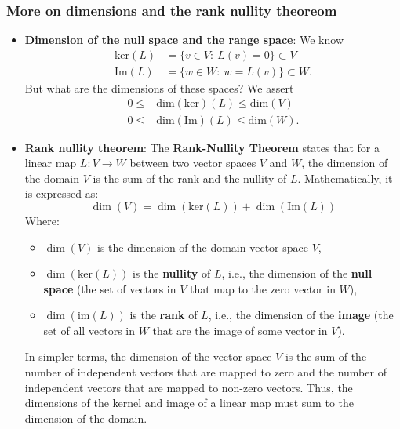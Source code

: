 \documentclass{report}
\begin{document}
    \subsubsection{More on dimensions and the rank nullity theoreom}
    \begin{itemize}
    \item \textbf{Dimension of the null space and the range space}: We know
        \begin{align*}
            \text{ker}(L) &= \{v\in V:\ L(v) = 0\} \subset V \\
            \text{Im}(L) &= \{w\in W:\ w = L(v)\} \subset W
        .\end{align*}
        But what are the dimensions of these spaces? We assert
        \begin{align*}
            0 \leq &\text{dim}(\text{ker})(L) \leq \text{dim}(V) \\
            0 \leq &\text{dim}(\text{Im})(L) \leq \text{dim}(W)
        .\end{align*}
        \item \textbf{Rank nullity theorem}: 
            The \textbf{Rank-Nullity Theorem} states that for a linear map \( L: V \to W \) between two vector spaces \( V \) and \( W \), the dimension of the domain \( V \) is the sum of the rank and the nullity of \( L \). Mathematically, it is expressed as:
            \[
                \dim(V) = \dim(\text{ker}(L)) + \dim(\text{Im}(L))
            \]
            Where:
            \begin{itemize}
                \item \( \dim(V) \) is the dimension of the domain vector space \( V \),
                \item \( \dim(\text{ker}(L)) \) is the \textbf{nullity} of \( L \), i.e., the dimension of the \textbf{null space} (the set of vectors in \( V \) that map to the zero vector in \( W \)),
                \item \( \dim(\text{im}(L)) \) is the \textbf{rank} of \( L \), i.e., the dimension of the \textbf{image} (the set of all vectors in \( W \) that are the image of some vector in \( V \)).
            \end{itemize}
            In simpler terms, the dimension of the vector space \( V \) is the sum of the number of independent vectors that are mapped to zero and the number of independent vectors that are mapped to non-zero vectors.
            \bigbreak \noindent 
            Thus, the dimensions of the kernel and image of a linear map must sum to the dimension of the domain.

\end{itemize}
\end{document}

